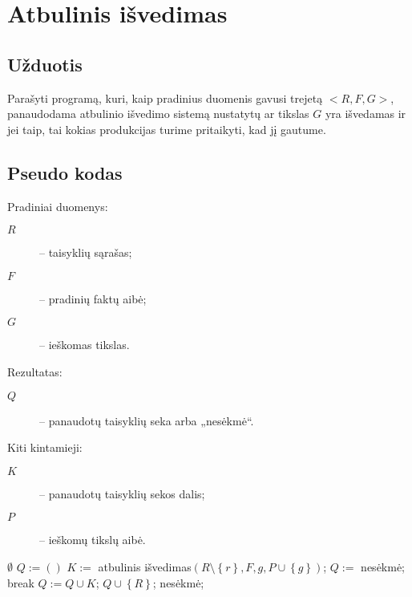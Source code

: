 \chapter{Atbulinis išvedimas}

\section{Užduotis}

Parašyti programą, kuri, kaip pradinius duomenis gavusi trejetą
$<R, F, G>$, panaudodama atbulinio išvedimo sistemą nustatytų
ar tikslas $G$ yra išvedamas ir jei taip, tai kokias produkcijas
turime pritaikyti, kad jį gautume.

\section{Pseudo kodas}

\label{sec:bc:pseudo}

Pradiniai duomenys:
\begin{description}
  \item[$R$] – taisyklių sąrašas;
  \item[$F$] – pradinių faktų aibė;
  \item[$G$] – ieškomas tikslas.
\end{description}

Rezultatas:
\begin{description}
  \item[$Q$] – panaudotų taisyklių seka arba „nesėkmė“.
\end{description}

Kiti kintamieji:
\begin{description}
  \item[$K$] – panaudotų taisyklių sekos dalis;
  \item[$P$] – ieškomų tikslų aibė.
\end{description}

\begin{algorithmic}[1]
     \label{bc:pseudo:goal_in_facts}
      \State \Return $\emptyset$ \label{bc:pseudo:emptyset}
    \Else
       \label{bc:pseudo:rule_iter}
        \State $Q := \left( \right)$ \label{bc:pseudo:initial_Q}
         \label{bc:pseudo:premise_iter}
          \State $K := $ atbulinis išvedimas$(%
            R\setminus \left\{ r \right\}, F, g,%
            P \cup \left\{ g \right\})$; \label{bc:pseudo:recursion}
           \label{bc:pseudo:rule:fail}
            \State $Q :=$ nesėkmė;
            \State break
          \Else \label{bc:pseudo:rule:success}
            \State $Q := Q \cup K$;
          \EndIf
           \label{bc:pseudo:success}
            \State \Return $Q \cup \left\{ R \right\}$;%
              \label{bc:pseudo:return_succ}
          \EndIf
        \EndFor
      \EndFor
      \State \Return nesėkmė; \label{bc:pseudo:failure}
    \EndIf
  \EndFunction
\end{algorithmic}

